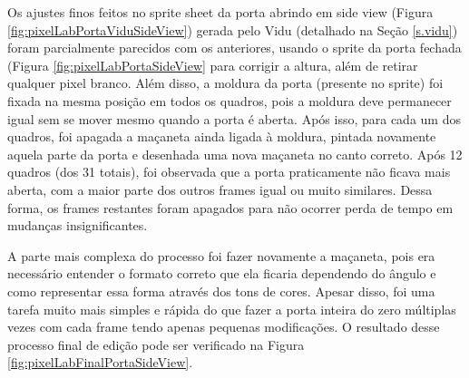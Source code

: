 \begin{figure}[htbp]
\end{figure}

Os ajustes finos feitos no sprite sheet da porta abrindo em side view (Figura \ref{fig:pixelLabPortaViduSideView}) gerada pelo Vidu (detalhado na Seção \ref{s.vidu}) foram parcialmente parecidos com os anteriores, usando o sprite da porta fechada (Figura \ref{fig:pixelLabPortaSideView} para corrigir a altura, além de retirar qualquer pixel branco. Além disso, a moldura da porta (presente no sprite) foi fixada na mesma posição em todos os quadros, pois a moldura deve permanecer igual sem se mover mesmo quando a porta é aberta. Após isso, para cada um dos quadros, foi apagada a maçaneta ainda ligada à moldura, pintada novamente aquela parte da porta e desenhada uma nova maçaneta no canto correto. Após 12 quadros (dos 31 totais), foi observada que a porta praticamente não ficava mais aberta, com a maior parte dos outros frames igual ou muito similares. Dessa forma, os frames restantes foram apagados para não ocorrer perda de tempo em mudanças insignificantes.

A parte mais complexa do processo foi fazer novamente a maçaneta, pois era necessário entender o formato correto que ela ficaria dependendo do ângulo e como representar essa forma através dos tons de cores. Apesar disso, foi uma tarefa muito mais simples e rápida do que fazer a porta inteira do zero múltiplas vezes com cada frame tendo apenas pequenas modificações. O resultado desse processo final de edição pode ser verificado na Figura \ref{fig:pixelLabFinalPortaSideView}.

